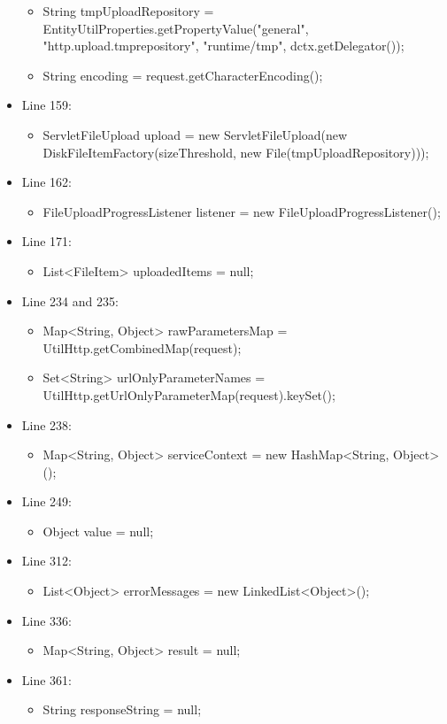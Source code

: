 \documentclass{article}
\begin{document}
\begin{itemize}[noitemsep]
\begin{itemize}[noitemsep]
\item String tmpUploadRepository = EntityUtilProperties.getPropertyValue("general", "http.upload.tmprepository", "runtime/tmp", dctx.getDelegator());
\item String encoding = request.getCharacterEncoding(); 
\end{itemize}         
\item Line 159: 
\begin{itemize}[noitemsep]
\item ServletFileUpload upload = new ServletFileUpload(new DiskFileItemFactory(sizeThreshold, new File(tmpUploadRepository))); \\
\end{itemize}  
\item Line 162: 
\begin{itemize}[noitemsep]
\item FileUploadProgressListener listener = new FileUploadProgressListener();
\end{itemize}  
\item Line 171:
\begin{itemize}[noitemsep]
\item  List<FileItem> uploadedItems = null;
\end{itemize}
\item Line 234 and 235:
\begin{itemize}[noitemsep]
\item  Map<String, Object> rawParametersMap = UtilHttp.getCombinedMap(request);
\item Set<String> urlOnlyParameterNames = UtilHttp.getUrlOnlyParameterMap(request).keySet();
\end{itemize}
\item Line 238:
\begin{itemize}[noitemsep]
\item Map<String, Object> serviceContext = new HashMap<String, Object>();
\end{itemize} 
\item Line 249: 
\begin{itemize}[noitemsep]
\item Object value = null;
\end{itemize}
\item Line 312:
\begin{itemize}[noitemsep]
\item List<Object> errorMessages = new LinkedList<Object>();
\end{itemize}
\item Line 336: 
\begin{itemize}[noitemsep]
\item Map<String, Object> result = null;
\end{itemize}
\item Line 361:
\begin{itemize}[noitemsep]
\item String responseString = null;
\end{itemize}
\end{itemize}
\end{document}
